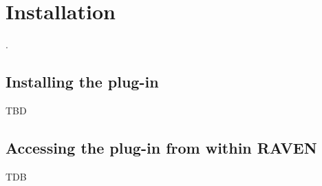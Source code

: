 
\section{Installation}
\label{sec:Installation}

 \cite{RAVEN}.

\subsection{Installing the plug-in}
 TBD

\subsection{Accessing the plug-in from within RAVEN}
 TDB
